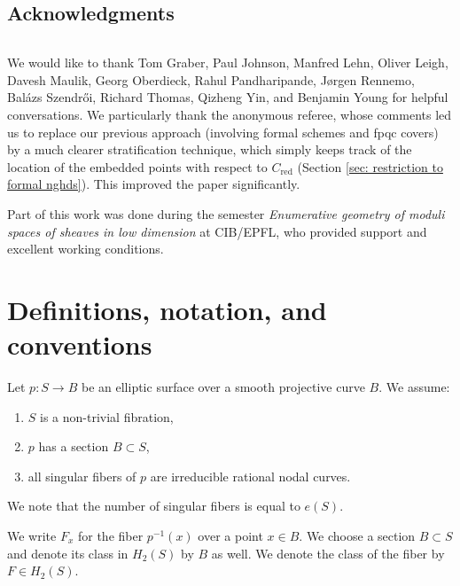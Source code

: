 \documentclass[12pt]{amsart}
\theoremstyle{definition}
\newcommand{\red}{\mathrm{red}}
\newcommand{\presectionspace}{\vspace{0.2cm}} %
\newcommand{\SubSecSpace}{$\,$\vspace{0.2cm}\par } %
\begin{document}
\subsection{Acknowledgments}
\SubSecSpace

We would like to thank Tom Graber, Paul Johnson, Manfred
Lehn, Oliver Leigh, Davesh Maulik, Georg Oberdieck, Rahul
Pandharipande, J{\o}rgen Rennemo, Bal\'azs Szendr\H{o}i, Richard
Thomas, Qizheng Yin, and Benjamin Young for helpful conversations.
We particularly thank the anonymous referee, whose comments led us to 
replace our previous approach (involving formal schemes and fpqc covers) 
by a much clearer stratification technique, which simply keeps track of the 
location of the embedded points with respect to $C_\red$ (Section \ref{sec: restriction to formal nghds}). 
This improved the paper significantly.


Part of this work was done during the semester \emph{Enumerative geometry 
of moduli spaces of sheaves in low dimension} at CIB/EPFL, who 
provided support and excellent working conditions.






\presectionspace
\section{Definitions, notation, and conventions} \label{defnotcon}

Let $p : S \rightarrow B$ be an elliptic surface over a smooth
projective curve $B$. We assume:
\begin{enumerate}
\item $S$ is a non-trivial fibration,
\item $p$ has a section $B \subset S$,
\item all singular fibers of $p$ are irreducible rational nodal curves. 
\end{enumerate}
We note that the number of singular fibers is equal to $e(S)$.

We write $F_x$ for the fiber $p^{-1}(x)$ over a  point $x \in
B$. We choose a section $B \subset S$ and denote its class in $H_2(S)$
by $B$ as well. We denote the class of the fiber by $F \in H_2(S)$.
\end{document}
